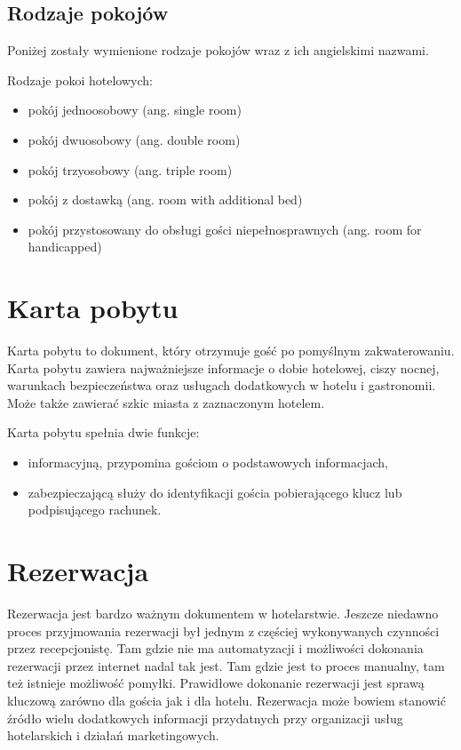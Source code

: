 \documentclass[a4paper,onecolumn,oneside,11pt,wide,floatssmall]{mwrep}
\theoremstyle{definition}
\theoremstyle{plain}%
\theoremstyle{remark}
\begin{document}
\subsection{Rodzaje pokojów}
Poniżej zostały wymienione rodzaje pokojów wraz z ich angielskimi nazwami.

Rodzaje pokoi hotelowych:
\begin{itemize}
  \item pokój jednoosobowy (ang. single room)
  \item pokój dwuosobowy (ang. double room)
  \item pokój trzyosobowy (ang. triple room)
  \item pokój z dostawką (ang. room with additional bed)
  \item pokój przystosowany do obsługi gości niepełnosprawnych (ang. room for 
  handicapped)
\end{itemize}

\section{Karta pobytu}
Karta pobytu to dokument, który otrzymuje gość po pomyślnym zakwaterowaniu. 
Karta pobytu zawiera najważniejsze informacje o dobie hotelowej, ciszy 
nocnej, warunkach bezpieczeństwa oraz usługach dodatkowych w hotelu i 
gastronomii. Może także zawierać szkic miasta z zaznaczonym hotelem.

Karta pobytu spełnia dwie funkcje:
\begin{itemize}
  \item{informacyjną}, przypomina gościom o podstawowych informacjach,
  \item{zabezpieczającą} służy do identyfikacji gościa pobierającego klucz 
  lub podpisującego rachunek.
\end{itemize}

\section{Rezerwacja}
Rezerwacja jest bardzo ważnym dokumentem w hotelarstwie. Jeszcze niedawno 
proces przyjmowania rezerwacji był jednym z częściej wykonywanych czynności 
przez recepcjonistę. Tam gdzie nie ma automatyzacji i możliwości dokonania 
rezerwacji przez internet nadal tak jest. Tam gdzie jest to proces manualny, 
tam też istnieje możliwość pomyłki. Prawidłowe dokonanie rezerwacji jest 
sprawą kluczową zarówno dla gościa jak i dla hotelu. Rezerwacja może bowiem 
stanowić źródło wielu dodatkowych informacji przydatnych przy organizacji 
usług hotelarskich i działań marketingowych.
\end{document}
